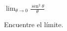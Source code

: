 \item $\displaystyle \lim_{\theta \to 0} \frac{\operatorname{sen}^2 \theta}{\theta}$
\par
Encuentre el límite.
